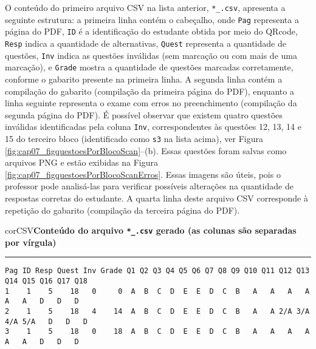 O conteúdo do primeiro arquivo CSV na lista anterior, \verb|*_.csv|, apresenta a seguinte estrutura: a primeira linha contém o cabeçalho, onde \verb|Pag| representa a página do PDF, \verb|ID| é a identificação do estudante obtida por meio do QRcode, \verb|Resp| indica a quantidade de alternativas, \verb|Quest| representa a quantidade de questões, \verb|Inv| indica as questões inválidas (sem marcação ou com mais de uma marcação), e \verb|Grade| mostra a quantidade de questões marcadas corretamente, conforme o gabarito presente na primeira linha. A segunda linha contém a compilação do gabarito (compilação da primeira página do PDF), enquanto a linha seguinte representa o exame com erros no preenchimento (compilação da segunda página do PDF). É possível observar que existem quatro questões inválidas identificadas pela coluna \verb|Inv|, correspondentes às questões 12, 13, 14 e 15 do terceiro bloco (identificado como \verb|s3| na lista acima), ver Figura \ref{fig:cap07_figquestoesPorBlocoScan}--(b). Essas questões foram salvas como arquivos PNG e estão exibidas na Figura \ref{fig:cap07_figquestoesPorBlocoScanErros}.  Essas imagens são úteis, pois o professor pode analisá-las para verificar possíveis alterações na quantidade de respostas corretas do estudante. A quarta linha deste arquivo CSV corresponde à repetição do gabarito (compilação da terceira página do PDF).

\begin{myboxCode}{corCSV}{\textbf{Conteúdo do arquivo \texttt{*\_.csv} gerado (as colunas são separadas por vírgula)}}\vspace{3mm}
\hrule
{\footnotesize
\begin{verbatim}
Pag ID Resp Quest Inv Grade Q1 Q2 Q3 Q4 Q5 Q6 Q7 Q8 Q9 Q10 Q11 Q12 Q13 Q14 Q15 Q16 Q17 Q18
1    1    5    18   0     0  A  B  C  D  E  E  D  C  B   A   A   A   A   A   A   D   D   D
2    1    5    18   4    14  A  B  C  D  E  E  D  C  B   A   A 2/A 3/A 4/A 5/A   D   D   D
3    1    5    18   0    18  A  B  C  D  E  E  D  C  B   A   A   A   A   A   A   D   D   D
\end{verbatim}
}
\end{myboxCode}


